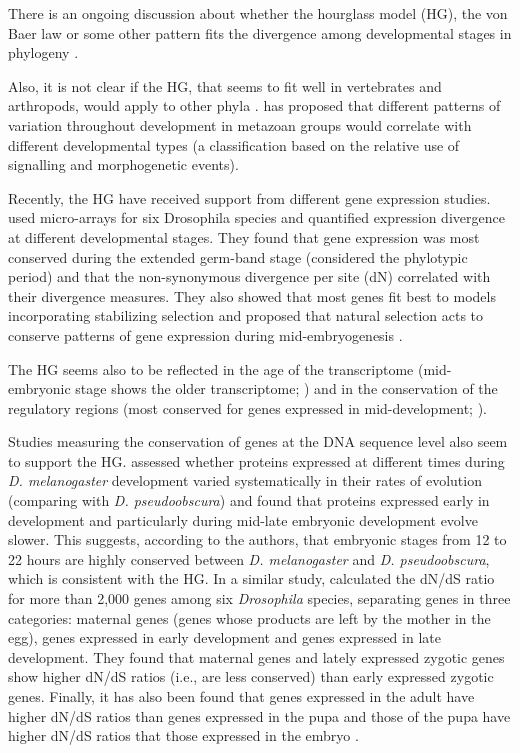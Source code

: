 There is an ongoing discussion about whether the hourglass model (HG), the von Baer law
or some other pattern fits the divergence among developmental stages in phylogeny \citep{Richardson1997,Poe2004,Kalinka2012}.

Also, it is not clear if the HG, that seems to fit well in vertebrates and arthropods, would apply to other phyla \citep{Raff1996} \citep{Salazar-Ciudad2010}.
\citet{Salazar-Ciudad2010} has proposed that different patterns of variation throughout development in metazoan groups would correlate with different developmental types (a classification based on the relative use of signalling and morphogenetic events).

Recently, the HG have received support from different gene expression studies.
\citet{Kalinka2010} used micro-arrays for six Drosophila species and quantified expression divergence at different developmental stages. They found that gene expression was most conserved during the extended germ-band stage (considered the phylotypic period) and that the non-synonymous divergence per site (dN) correlated with their divergence measures.
They also showed that most genes fit best to models incorporating stabilizing selection and proposed that natural selection acts to conserve patterns of gene expression during mid-embryogenesis \citep{Kalinka2010}.

The HG seems also to be reflected in the age of the transcriptome (mid-embryonic stage shows the older transcriptome; \citealp{Domazet-Loso2010}) and in the conservation of the regulatory regions (most conserved for genes expressed in mid-development; \citealp{Piasecka2013}).

Studies measuring the conservation of genes at the DNA sequence level also seem to support the HG.
\citet{Davis2005} assessed whether proteins expressed at different times during \textit{D.  melanogaster} development varied systematically in their rates of evolution (comparing with \textit{D. pseudoobscura}) and found that proteins expressed early in development and particularly during mid-late embryonic development evolve slower.  
This suggests, according to the authors, that embryonic stages from 12 to 22 hours are
highly conserved between \textit{D. melanogaster} and \textit{D. pseudoobscura}, which is consistent with the HG.
%
In a similar study, \citet{Mensch2013} calculated the dN/dS ratio for more than 2,000 genes among six \textit{Drosophila} species, separating genes in three categories: maternal genes (genes whose products are left by the mother in the egg), genes expressed in early development and genes expressed in late development. They found that maternal genes and lately expressed zygotic genes show higher dN/dS ratios (i.e., are less conserved) than early expressed zygotic genes.
Finally, it has also been found that genes expressed in the adult have higher dN/dS ratios than genes expressed in the pupa and those of the pupa have higher dN/dS ratios that those expressed in the embryo \citep{Artieri2009}.

